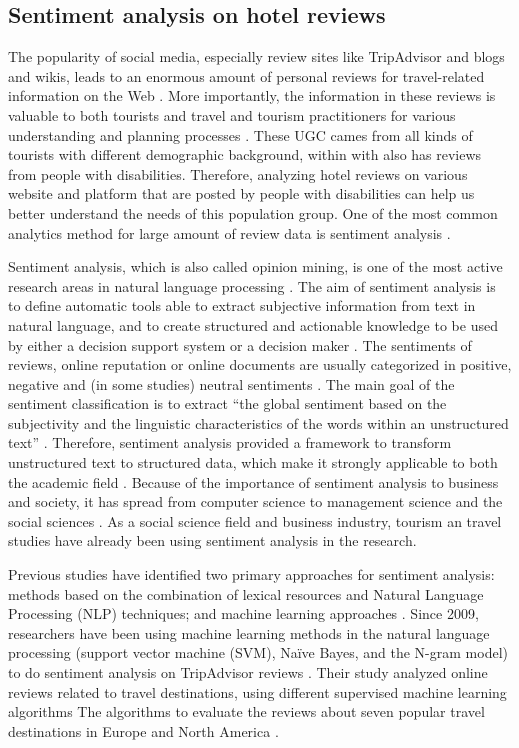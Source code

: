 \subsection{Sentiment analysis on hotel reviews}
The popularity of social media, especially review sites like 
TripAdvisor and blogs and wikis, leads to an enormous amount of personal 
reviews for travel-related information on the Web \cite{opinion2014}. 
More importantly, the information in these reviews is valuable to both 
tourists and travel and tourism practitioners for various understanding 
and planning processes \cite{YE20096527}. These UGC cames from all kinds of 
tourists with different demographic background, within with also has reviews 
from people with disabilities. Therefore, analyzing hotel reviews on various 
website and platform that are posted by people with disabilities can help 
us better understand the needs of this population group. One of the most 
common analytics method for large amount of review data is sentiment analysis \cite{opinion2014}.

Sentiment analysis, which is also called opinion mining, is one of the most active
research areas in natural language processing \cite{opinion2014}. The aim of 
sentiment analysis is to define automatic tools able to extract subjective 
information from text in natural language, and to create 
structured and actionable knowledge to be used by either a decision support 
system or a decision maker \cite{article, YE20096527} . The sentiments of reviews, online reputation or 
online documents are usually categorized in positive, negative and (in some 
studies) neutral sentiments \cite{Garcia2012}. The main goal of the sentiment 
classification is to extract ``the global sentiment based on the subjectivity 
and the linguistic characteristics of the words within an unstructured text'' 
\cite{Garcia2012}. Therefore, sentiment analysis provided a framework to 
transform unstructured text to structured data, which make it strongly 
applicable to both the academic field \cite{Cam2013}. Because of the 
importance of sentiment analysis to business and society, it has spread 
from computer science to management science and the social sciences \cite{Pozzi}. 
As a social science field and business industry, tourism an travel studies 
have already been using sentiment analysis in the research.

Previous studies have identified two primary approaches for sentiment 
analysis: methods based on the combination of lexical resources and 
Natural Language Processing (NLP) techniques; and machine learning 
approaches \cite{Garcia2012}. Since 2009, researchers have been using 
machine learning methods in the natural language processing (support 
vector machine (SVM), Naïve Bayes, and the N-gram model) to do sentiment 
analysis on TripAdvisor reviews \cite{YE20096527}. 
Their study analyzed online reviews related to travel destinations, 
using different supervised machine learning algorithms The
algorithms to evaluate the reviews about seven popular travel destinations 
in Europe and North America \cite{YE20096527}.

